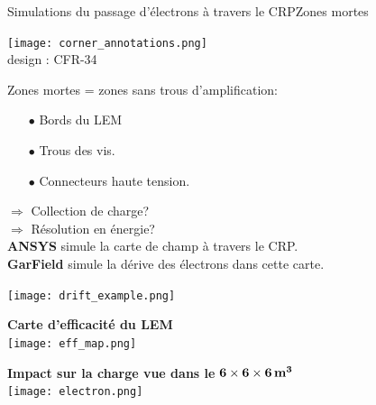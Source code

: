     \begin{frame}{Simulations du passage d'électrons à travers le CRP}{Zones mortes}
    	\begin{scriptsize}
    		\begin{minipage}{0.38\textwidth}
    			\begin{center}
    				\texttt{[image: corner\_annotations.png]}\\
    				design : CFR-34\\
    			\end{center} 
    			Zones mortes = zones sans trous d'amplification:
    			\begin{itemize}
    				\item[$\bullet$] Bords du LEM
    				\item[$\bullet$] Trous des vis.
    				\item[$\bullet$] Connecteurs haute tension.
    			\end{itemize}
    			$\Rightarrow$ Collection de charge?\\
    			$\Rightarrow$ Résolution en énergie?\\
    			
    			\textbf{ANSYS} simule la carte de champ à travers le CRP.\\
    			\textbf{GarField} simule la dérive des électrons dans cette carte.\\
    		\end{minipage}
    		\begin{minipage}{0.58\textwidth}
    			\centering
    			\texttt{[image: drift\_example.png]}\\
    			\vspace{0.5cm} \hspace{0.1cm}
    			\begin{minipage}{0.48\textwidth}
    				\centering
    				\textbf{Carte d'efficacité du LEM}\\
    				\texttt{[image: eff\_map.png]}
    			\end{minipage}\hfill
    			\begin{minipage}{0.48\textwidth}
    				\centering
    				\textbf{Impact sur la charge vue dans le} $\mathbf{6 \times 6 \times 6} \,\textbf{\si[detect-weight]{\meter\cubed}}$\\
    				\texttt{[image: electron.png]}
    			\end{minipage}
    		\end{minipage}
    	\end{scriptsize} 
    \end{frame}

